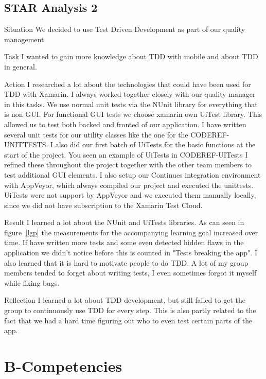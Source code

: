 \documentclass[12pt]{article}
\begin{document}
\subsection{STAR Analysis 2}
\begin{STAR}
    \item[Situation] We decided to use Test Driven Development as part of our quality management. 
    \item[Task] I wanted to gain more knowledge about TDD with mobile and about TDD in general. 
    \item[Action] I researched a lot about the technologies that could have been used for TDD with Xamarin. I always worked together closely with our quality manager in this tasks. We use normal unit tests via the NUnit library for everything that is non GUI. For functional GUI tests we choose xamarin own UiTest library. This allowed us to test both backed and fronted of our application. I have written several unit tests for our utility classes like the one for the CODEREF-UNITTESTS. I also did our first batch of UiTests for the basic functions at the start of the project. You seen an example of UiTests in CODEREF-UITests I refined these throughout the project together with the other team members to test additional GUI elements. I also setup our Continues integration environment with AppVeyor, which always compiled our project and executed the unittests. UiTests were not support by AppVeyor and we executed them manually locally, since we did not have subscription to the Xamarin Test Cloud.
    \item[Result] I learned a lot about the NUnit and UiTests libraries. 
    As can seen in figure~\ref{lgp} the measurements for the accompanying learning goal increased over time. If have written more tests and some even detected hidden flaws in the application we didn't notice before this is counted in "Tests breaking the app". I also learned that it is hard to motivate people to do TDD. A lot of my group members tended to forget about writing tests, I even sometimes forgot it myself while fixing bugs.
    \item[Reflection] I learned a lot about TDD development, but still failed to get the group to continuously use TDD for every step. This is also partly related to the fact that we had a hard time figuring out who to even test certain parts of the app.
\end{STAR}

\section{B-Competencies}
\end{document}
